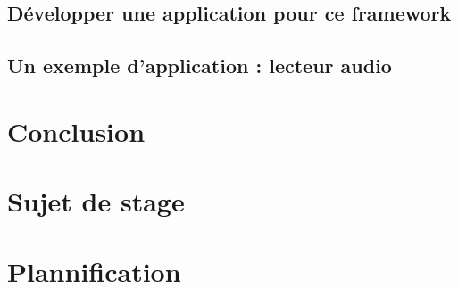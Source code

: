 \documentclass[a4paper, 11pt]{report}
\begin{document}
	\section{Développer une application pour ce framework}
	\section{Un exemple d'application : lecteur audio}

\chapter{Conclusion}



\listoffigures{}
\listoftables{}
\appendix

\chapter{Sujet de stage}


\chapter{Plannification}
\end{document}
